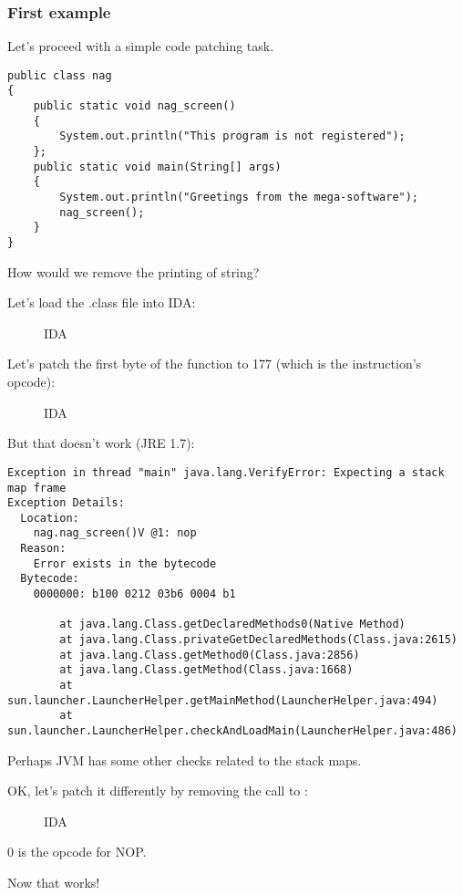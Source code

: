 \subsubsection{First example}

Let's proceed with a simple code patching task.

\begin{lstlisting}[style=customjava]
public class nag
{
	public static void nag_screen()
	{
		System.out.println("This program is not registered");
	};
	public static void main(String[] args) 
	{
		System.out.println("Greetings from the mega-software");
		nag_screen();
	}
}
\end{lstlisting}

How would we remove the printing of  string?


Let's load the .class file into IDA:


\begin{figure}[H]
\centering
{}
\caption{IDA}
\end{figure}

Let's patch the first byte of the function to 177 (which is the  instruction's opcode):


\begin{figure}[H]
\centering
{}
\caption{IDA}
\end{figure}

But that doesn't work (JRE 1.7):

\begin{lstlisting}
Exception in thread "main" java.lang.VerifyError: Expecting a stack map frame
Exception Details:
  Location:
    nag.nag_screen()V @1: nop
  Reason:
    Error exists in the bytecode
  Bytecode:
    0000000: b100 0212 03b6 0004 b1

        at java.lang.Class.getDeclaredMethods0(Native Method)
        at java.lang.Class.privateGetDeclaredMethods(Class.java:2615)
        at java.lang.Class.getMethod0(Class.java:2856)
        at java.lang.Class.getMethod(Class.java:1668)
        at sun.launcher.LauncherHelper.getMainMethod(LauncherHelper.java:494)
        at sun.launcher.LauncherHelper.checkAndLoadMain(LauncherHelper.java:486)
\end{lstlisting}

Perhaps JVM has some other checks related to the stack maps.%


OK, let's patch it differently by removing the call to :


\begin{figure}[H]
\centering
{}
\caption{IDA}
\end{figure}

0 is the opcode for \ac{NOP}.


Now that works!
